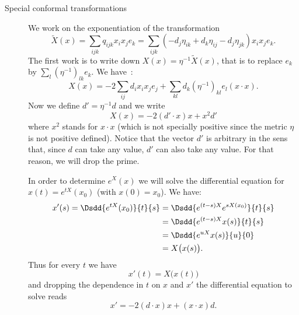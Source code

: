 \begin{description}
\item[Special conformal transformations]

    We work on the exponentiation of the transformation
    \begin{equation}
        \tilde X(x)=\sum_{ijk}q_{ijk}x_ix_je_k=\sum_{ijk}(-d_j\eta_{ik}+d_k\eta_{ij}-d_j\eta_{jk})x_ix_je_k.
    \end{equation}
    The first work is to write down \( X(x)=\eta^{-1}\tilde X(x)\), that is to replace \( e_k\) by \( \sum_l(\eta^{-1})_{lk}e_k\). We have~:
    \begin{equation}
        X(x)=-2\sum_{ij}d_ix_ix_je_j+\sum_{kl}d_k(\eta^{-1})_{kl}e_l(x\cdot x).
    \end{equation}
    Now we define \( d'=\eta^{-1}d\) and we write
    \begin{equation}
        X(x)=-2(d'\cdot x)x+x^2d'
    \end{equation}
    where \( x^2\) stands for \( x\cdot x\) (which is not specially positive since the metric \( \eta\) is not positive defined). Notice that the vector \( d'\) is arbitrary in the sens that, since \( d\) can take any value, \( d'\) can also take any value. For that reason, we will drop the prime.

    In order to determine \(  e^{X}(x)\) we will solve the differential equation for \( x(t)= e^{tX}(x_0)\) (with \( x(0)=x_0\)). We have:
    \begin{subequations}
        \begin{align}
            x'(s)=\Dsdd{  e^{tX}(x_0) }{t}{s}&=\Dsdd{  e^{(t-s)X}   e^{sX(x_0)}  }{t}{s}\\
            &=\Dsdd{  e^{(t-s)X}x(s) }{t}{s}\\
            &=\Dsdd{  e^{uX}x(s) }{u}{0}\\
            &=X\big( x(s) \big).
        \end{align}
    \end{subequations}
    Thus for every \( t\) we have
    \begin{equation}
        x'(t)=X\big( x(t) \big)
    \end{equation}
    and dropping the dependence in \( t\) on \( x\) and \( x'\) the differential equation to solve reads\cite{ooUCSPooYwxHzL}
    \begin{equation}
        x'=-2(d\cdot x)x+(x\cdot x)d.
    \end{equation}


\end{description}
